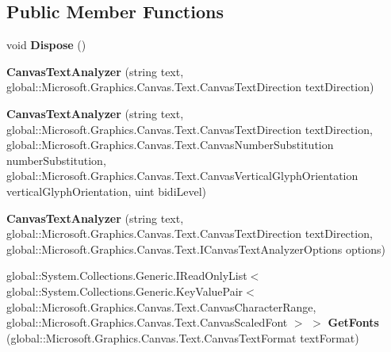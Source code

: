 \subsection*{Public Member Functions}
\begin{DoxyCompactItemize}
\item 
\mbox{\label{class_microsoft_1_1_graphics_1_1_canvas_1_1_text_1_1_canvas_text_analyzer_a29ec6d38a21ef39bf02be6c27ca74fe9}} 
void {\bfseries Dispose} ()
\item 
\mbox{\label{class_microsoft_1_1_graphics_1_1_canvas_1_1_text_1_1_canvas_text_analyzer_a9b82d9ebaf24510683045414b6ffb1a9}} 
{\bfseries Canvas\+Text\+Analyzer} (string text, global\+::\+Microsoft.\+Graphics.\+Canvas.\+Text.\+Canvas\+Text\+Direction text\+Direction)
\item 
\mbox{\label{class_microsoft_1_1_graphics_1_1_canvas_1_1_text_1_1_canvas_text_analyzer_aea0f6d0276cc0876f6d564ad7663e994}} 
{\bfseries Canvas\+Text\+Analyzer} (string text, global\+::\+Microsoft.\+Graphics.\+Canvas.\+Text.\+Canvas\+Text\+Direction text\+Direction, global\+::\+Microsoft.\+Graphics.\+Canvas.\+Text.\+Canvas\+Number\+Substitution number\+Substitution, global\+::\+Microsoft.\+Graphics.\+Canvas.\+Text.\+Canvas\+Vertical\+Glyph\+Orientation vertical\+Glyph\+Orientation, uint bidi\+Level)
\item 
\mbox{\label{class_microsoft_1_1_graphics_1_1_canvas_1_1_text_1_1_canvas_text_analyzer_a172420a2c7819041ea02464efb76d339}} 
{\bfseries Canvas\+Text\+Analyzer} (string text, global\+::\+Microsoft.\+Graphics.\+Canvas.\+Text.\+Canvas\+Text\+Direction text\+Direction, global\+::\+Microsoft.\+Graphics.\+Canvas.\+Text.\+I\+Canvas\+Text\+Analyzer\+Options options)
\item 
\mbox{\label{class_microsoft_1_1_graphics_1_1_canvas_1_1_text_1_1_canvas_text_analyzer_ac1c293067524638962722883284c69ca}} 
global\+::\+System.\+Collections.\+Generic.\+I\+Read\+Only\+List$<$ global\+::\+System.\+Collections.\+Generic.\+Key\+Value\+Pair$<$ global\+::\+Microsoft.\+Graphics.\+Canvas.\+Text.\+Canvas\+Character\+Range, global\+::\+Microsoft.\+Graphics.\+Canvas.\+Text.\+Canvas\+Scaled\+Font $>$ $>$ {\bfseries Get\+Fonts} (global\+::\+Microsoft.\+Graphics.\+Canvas.\+Text.\+Canvas\+Text\+Format text\+Format)

\end{DoxyCompactItemize}
